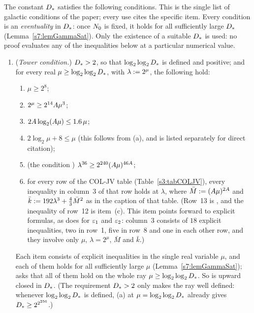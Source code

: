 \begin{condition}\label{s1:condGamma}
The constant $D_{*}$ satisfies the following conditions. This is the single list
of galactic conditions of the paper; every use cites the specific item.
Every condition is an \emph{eventuality} in $D_{*}$: once $N_{0}$ is fixed, it
holds for all sufficiently large $D_{*}$ (Lemma~\ref{s7:lemGammaSat}). Only the
existence of a suitable $D_{*}$ is used: no proof evaluates any of the
inequalities below at a particular numerical value.
\begin{enumerate}
\item[\Gc{1}] (\emph{Tower condition.})
$D_{*}>2$, so that $\log_2\log_2D_{*}$ is defined and positive; and for every real
$\mu\ge\log_2\log_2D_{*}$, with $\lambda\mathrel{:=}2^\mu$, the following hold:
\begin{enumerate}
\item[(a)] $\mu\ge2^8$;
\item[(b)] $2^\mu\ge2^{14}A\mu^3$;
\item[(c)] $2A\log_2(A\mu)\le1.6\,\mu$;
\item[(d)] $2\log_2\mu+8\le\mu$ (this follows from (a), and is listed
separately for direct citation);
\item[(e)] (the condition \Gstar)
$\lambda^{36}\ge2^{240}(A\mu)^{46A}$;
\item[(f)] for every row of the COL-JV table (Table~\ref{s3:tabCOLJV}), every
inequality in column~3 of that row holds at $\lambda$, where
$\bar M\mathrel{:=}(A\mu)^{2A}$ and $\bar k\mathrel{:=}192\lambda^3+\frac43\bar M^2$ as in
the caption of that table. (Row~13 is \Gstar, and the inequality of row~12 is
item~(c). This item points forward to explicit formulas, as  does for
$\varepsilon_{1}$ and $\varepsilon_{2}$: column~3 consists of $18$ explicit inequalities, two in
row~1, five in row~8 and one in each other row, and they involve only $\mu$,
$\lambda=2^\mu$, $\bar M$ and $\bar k$.)
\end{enumerate}
Each item consists of explicit inequalities in the single real variable $\mu$,
and each of them holds for all sufficiently large $\mu$
(Lemma~\ref{s7:lemGammaSat});  asks that
all of them hold on the whole ray $\mu\ge\log_2\log_2D_{*}$. So  is upward
closed in $D_{*}$. (The requirement $D_{*}>2$ only makes the ray well
defined: whenever $\log_2\log_2D_{*}$ is defined, (a) at
$\mu=\log_2\log_2D_{*}$ already gives $D_{*}\ge2^{2^{256}}$.)


\end{enumerate}
\end{condition}
